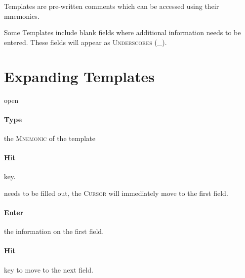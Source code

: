 Templates are pre-written comments which can be accessed using their mnemonics.

Some Templates include blank fields where additional information needs to be entered. These fields will appear as \textsc{Underscores (\_)}.

\section{Expanding Templates}

 open

\paragraph{Type} the \textsc{Mnemonic} of the template\\


\paragraph{Hit} {\faKeyboardO}  key.\\


 needs to be filled out, the \textsc{Cursor} will immediately move to the first field.

\paragraph{Enter} the information on the first field.\\


\paragraph{Hit} {\faKeyboardO}  key to move to the next field.\\


